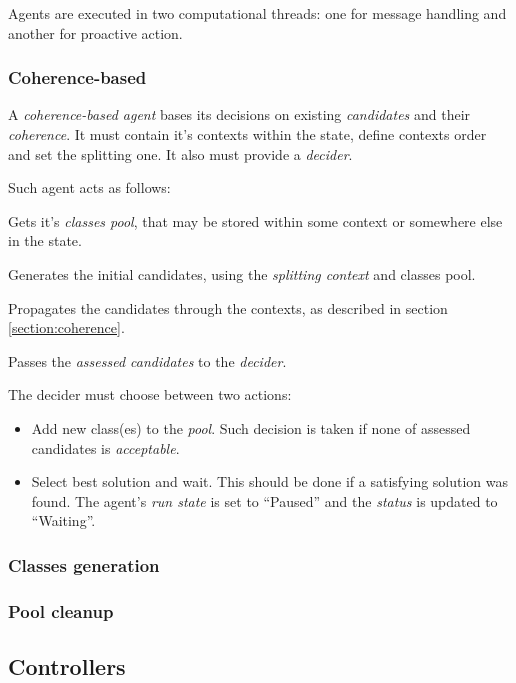 Agents are executed in two computational threads: one for message handling
and another for proactive action.

\subsubsection{Coherence-based}

A \emph{coherence-based agent} bases its decisions on existing \emph{candidates}
and their \emph{coherence}. It must contain it's contexts within the state,
define contexts order and set the splitting one. It also must provide a
\emph{decider}.

Such agent acts as follows:
\begin{enumerate*}
\item Gets it's \emph{classes pool}, that may be stored within some context or
  somewhere else in the state.
\item Generates the initial candidates, using the \emph{splitting context} and
  classes pool.
\item Propagates the candidates through the contexts, as described in section
  \ref{section:coherence}.
\item Passes the \emph{assessed candidates} to the \emph{decider}.
\end{enumerate*}

The decider must choose between two actions:
\begin{itemize}
\item Add new class(es) to the \emph{pool}. Such decision is taken if
  none of assessed candidates is \emph{acceptable}.
\item Select best solution and wait. This should be done if a satisfying
  solution was found. The agent's \emph{run state} is set to ``Paused'' and
  the \emph{status} is updated to ``Waiting''.
\end{itemize}

\subsubsection{Classes generation}


\subsubsection{Pool cleanup}





\subsection{Controllers}

